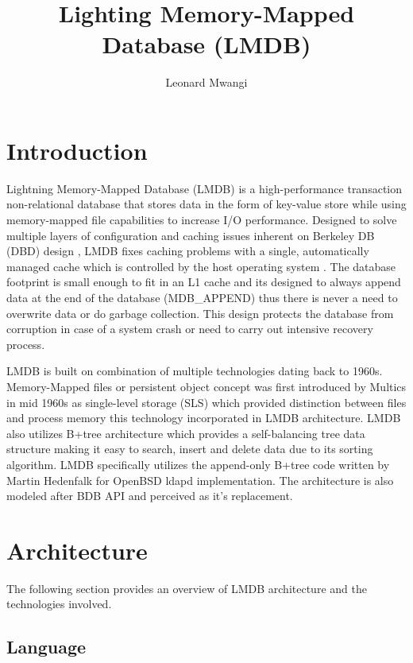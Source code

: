 \documentclass[9pt,twocolumn,twoside]{styles/osajnl}
\title{Lighting Memory-Mapped Database (LMDB)}
\author[1]{Leonard Mwangi}
\affil[1]{School of Informatics and Computing, Bloomington, IN 47408, U.S.A.}
\affil[*]{Corresponding authors: lmwangi@iu.edu}
\begin{document}
\maketitle

\section{Introduction}

Lightning Memory-Mapped Database (LMDB) is a high-performance
transaction non-relational database that stores data in the form of
key-value store \cite{www-keyvalue} while using memory-mapped file
capabilities to increase I/O performance. Designed to solve multiple
layers of configuration and caching issues inherent on Berkeley DB
(DBD) design \cite{www-bdb}, LMDB fixes caching problems with a
single, automatically managed cache which is controlled by the host
operating system \cite{www-lmdb}. The database footprint is small
enough to fit in an L1 cache \cite{www-l-cache} and its designed to
always append data at the end of the database (MDB\_APPEND) thus there
is never a need to overwrite data or do garbage collection. This
design protects the database from corruption in case of a system crash
or need to carry out intensive recovery process.

LMDB is built on combination of multiple technologies dating back to
1960s. Memory-Mapped files or persistent object concept was first
introduced by Multics in mid 1960s as single-level storage (SLS)
\cite{www-multics} which provided distinction between files and
process memory this technology incorporated in LMDB architecture. LMDB
also utilizes B+tree architecture which provides a self-balancing tree
data structure making it easy to search, insert and delete data due to
its sorting algorithm. LMDB specifically utilizes the append-only
B+tree code written by Martin Hedenfalk \cite{www-btreecode} for
OpenBSD ldapd implementation. The architecture is also modeled after
BDB API and perceived as it’s replacement.

\section{Architecture}
The following section provides an overview of LMDB architecture and
the technologies involved.

\subsection{Language}
\end{document}

